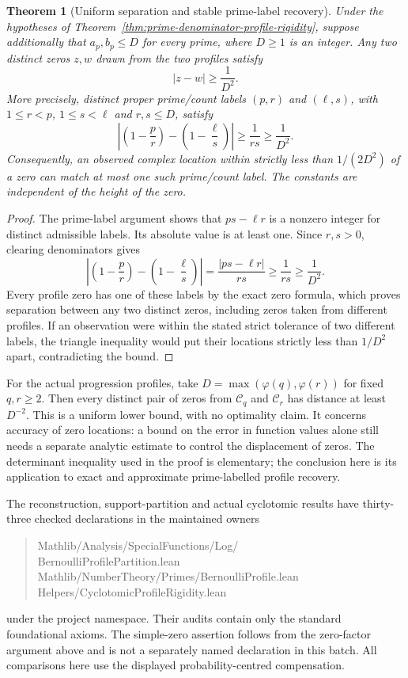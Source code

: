 \documentclass[11pt]{article}
\newtheorem{theorem}{Theorem}[section]
\theoremstyle{definition}
\begin{document}
\begin{theorem}[Uniform separation and stable prime-label recovery]
\label{thm:prime-profile-stable-recovery}
Under the hypotheses of Theorem~\ref{thm:prime-denominator-profile-rigidity},
suppose additionally that $a_p,b_p\le D$ for every prime, where
$D\ge1$ is an integer.
Any two distinct zeros $z,w$ drawn from the two profiles satisfy
\[
 |z-w|\ge \frac1{D^2}.
\]
More precisely, distinct proper prime/count labels $(p,r)$ and
$(\ell,s)$, with $1\le r<p$, $1\le s<\ell$ and $r,s\le D$,
satisfy
\[
 \left|\left(1-\frac p r\right)
           -\left(1-\frac\ell s\right)\right|
       \ge\frac1{rs}\ge\frac1{D^2}.
\]
Consequently, an observed complex location within strictly less than
$1/(2D^2)$ of a zero can match at most one such prime/count label.
The constants are independent of the height of the zero.
\end{theorem}

\begin{proof}
The prime-label argument shows that $ps-\ell r$ is a nonzero integer
for distinct admissible labels. Its absolute value is at least one.
Since $r,s>0$, clearing denominators gives
\[
 \left|\left(1-\frac p r\right)
           -\left(1-\frac\ell s\right)\right|
   =\frac{|ps-\ell r|}{rs}\ge\frac1{rs}\ge\frac1{D^2}.
\]
Every profile zero has one of these labels by the exact zero formula,
which proves separation between any two distinct zeros, including
zeros taken from different profiles.
If an observation were within the stated strict tolerance of two
different labels, the triangle inequality would put their locations
strictly less than $1/D^2$ apart, contradicting the bound.
\end{proof}

For the actual progression profiles, take
$D=\max(\varphi(q),\varphi(r))$ for fixed $q,r\ge2$.
Then every distinct pair of zeros from $\mathcal C_q$ and
$\mathcal C_r$ has distance at least $D^{-2}$.
This is a uniform lower bound, with no optimality claim.
It concerns accuracy of zero locations: a bound on the error in
function values alone still needs a separate analytic estimate to
control the displacement of zeros. The determinant inequality used
in the proof is elementary; the conclusion here is its application
to exact and approximate prime-labelled profile recovery.

The reconstruction, support-partition and actual cyclotomic results have
thirty-three checked declarations in the maintained owners
\begin{quote}\small\ttfamily
Mathlib/Analysis/SpecialFunctions/Log/\\
\hspace*{1em}BernoulliProfilePartition.lean\\
Mathlib/NumberTheory/Primes/BernoulliProfile.lean\\
Helpers/CyclotomicProfileRigidity.lean
\end{quote}
under the project namespace. Their audits contain only the standard
foundational axioms. The simple-zero assertion follows from the
zero-factor argument above and is not a separately named declaration in
this batch. All comparisons here use the displayed probability-centred
compensation.
\end{document}
